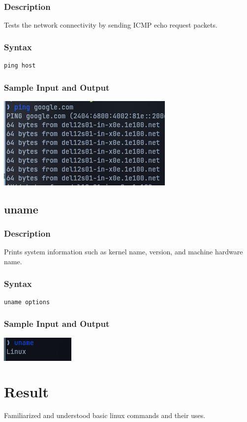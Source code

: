 \subsubsection{Description}
Tests the network connectivity by sending ICMP echo request packets.

\subsubsection{Syntax}
\begin{verbatim}
ping host
\end{verbatim}

\subsubsection{Sample Input and Output}
\includegraphics[]{Cycle_1//Outputs/ping.png}


\subsection{uname}
\subsubsection{Description}
Prints system information such as kernel name, version, and machine hardware name.

\subsubsection{Syntax}
\begin{verbatim}
uname options
\end{verbatim}

\subsubsection{Sample Input and Output}
\includegraphics[]{Cycle_1//Outputs/uname.png}


\section{Result}
Familiarized and understood basic linux commands and their uses.